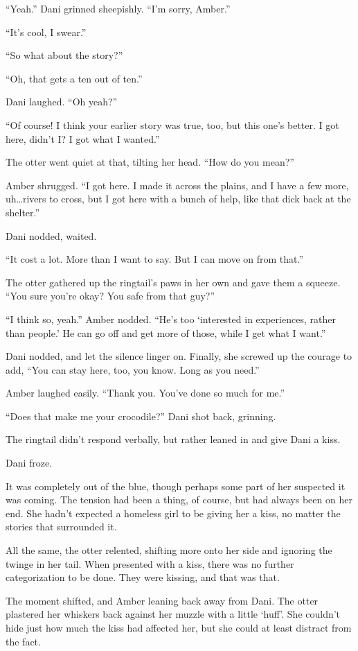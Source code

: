 ``Yeah.'' Dani grinned sheepishly. ``I'm sorry, Amber.''

``It's cool, I swear.''

``So what about the story?''

``Oh, that gets a ten out of ten.''

Dani laughed. ``Oh yeah?''

``Of course! I think your earlier story was true, too, but this one's better. I got here, didn't I? I got what I wanted.''

The otter went quiet at that, tilting her head. ``How do you mean?''

Amber shrugged. ``I got here. I made it across the plains, and I have a few more, uh\ldots{}rivers to cross, but I got here with a bunch of help, like that dick back at the shelter.''

Dani nodded, waited.

``It cost a lot. More than I want to say. But I can move on from that.''

The otter gathered up the ringtail's paws in her own and gave them a squeeze. ``You sure you're okay? You safe from that guy?''

``I think so, yeah.'' Amber nodded. ``He's too `interested in experiences, rather than people.' He can go off and get more of those, while I get what I want.''

Dani nodded, and let the silence linger on. Finally, she screwed up the courage to add, ``You can stay here, too, you know. Long as you need.''

Amber laughed easily. ``Thank you. You've done so much for me.''

``Does that make me your crocodile?'' Dani shot back, grinning.

The ringtail didn't respond verbally, but rather leaned in and give Dani a kiss.

Dani froze.

It was completely out of the blue, though perhaps some part of her suspected it was coming. The tension had been a thing, of course, but had always been on her end. She hadn't expected a homeless girl to be giving her a kiss, no matter the stories that surrounded it.

All the same, the otter relented, shifting more onto her side and ignoring the twinge in her tail. When presented with a kiss, there was no further categorization to be done. They were kissing, and that was that.

The moment shifted, and Amber leaning back away from Dani. The otter plastered her whiskers back against her muzzle with a little `huff'. She couldn't hide just how much the kiss had affected her, but she could at least distract from the fact.

